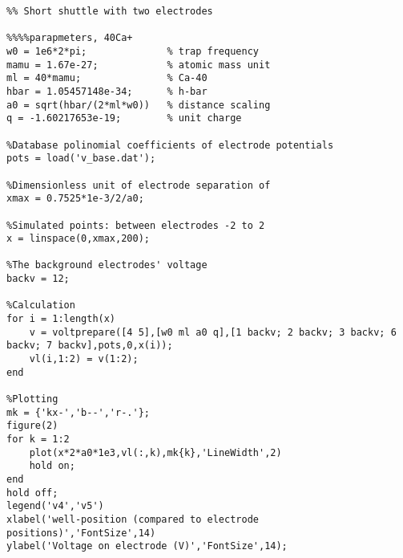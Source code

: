 \begin{mylisting}
\begin{verbatim}
%% Short shuttle with two electrodes 

%%%%parapmeters, 40Ca+
w0 = 1e6*2*pi;              % trap frequency
mamu = 1.67e-27;            % atomic mass unit
ml = 40*mamu;               % Ca-40
hbar = 1.05457148e-34;      % h-bar
a0 = sqrt(hbar/(2*ml*w0))   % distance scaling
q = -1.60217653e-19;        % unit charge

%Database polinomial coefficients of electrode potentials
pots = load('v_base.dat');

%Dimensionless unit of electrode separation of
xmax = 0.7525*1e-3/2/a0;

%Simulated points: between electrodes -2 to 2
x = linspace(0,xmax,200);

%The background electrodes' voltage
backv = 12;

%Calculation
for i = 1:length(x)
    v = voltprepare([4 5],[w0 ml a0 q],[1 backv; 2 backv; 3 backv; 6 backv; 7 backv],pots,0,x(i));
    vl(i,1:2) = v(1:2);
end

%Plotting
mk = {'kx-','b--','r-.'};
figure(2)
for k = 1:2
    plot(x*2*a0*1e3,vl(:,k),mk{k},'LineWidth',2)
    hold on;
end
hold off;
legend('v4','v5')
xlabel('well-position (compared to electrode positions)','FontSize',14)
ylabel('Voltage on electrode (V)','FontSize',14);
\end{verbatim}
\end{mylisting}

